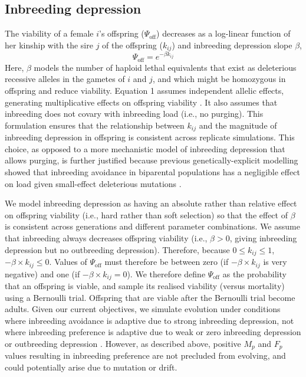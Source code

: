 \documentclass[12pt]{article}
\begin{document}
\subsection*{Inbreeding depression}

The viability of a female $i$'s offspring ($\Psi_{\textrm{off}}$) decreases as a log-linear function of her kinship with the sire $j$ of the offspring ($k_{ij}$) and inbreeding depression slope $\beta$,
\begin{equation}
\Psi_{\textrm{off}} = e^{-\beta k_{ij}}
\end{equation}
Here, $\beta$ models the number of haploid lethal equivalents that exist as deleterious recessive alleles in the gametes of $i$ and $j$, and which might be homozygous in offspring and reduce viability. Equation 1 assumes independent allelic effects, generating multiplicative effects on offspring viability \cite[][]{Morton1956, Mills1994}. It also assumes that inbreeding does not covary with inbreeding load (i.e., no purging). This formulation ensures that the relationship between $k_{ij}$ and the magnitude of inbreeding depression in offspring is consistent across replicate simulations. This choice, as opposed to a more mechanistic model of inbreeding depression that allows purging, is further justified because previous genetically-explicit modelling \cite[][]{Duthie2016a} showed that inbreeding avoidance in biparental populations has a negligible effect on load given small-effect deleterious mutations \cite[see also][]{Wang1999, Guillaume2006}. 

We model inbreeding depression as having an absolute rather than relative effect on offspring viability (i.e., hard rather than soft selection) so that the effect of $\beta$ is consistent across generations and different parameter combinations. We assume that inbreeding always decreases offspring viability (i.e., $\beta > 0$, giving inbreeding depression but no outbreeding depression). Therefore, because $0 \leq k_{ij} \leq 1$, $-\beta \times k_{ij} \leq 0$. Values of $\Psi_{\textrm{off}}$ must therefore be between zero (if $-\beta \times k_{ij}$ is very negative) and one (if $-\beta \times k_{ij} = 0$). We therefore define $\Psi_{\textrm{off}}$ as the probability that an offspring is viable, and sample its realised viability (versus mortality) using a Bernoulli trial. Offspring that are viable after the Bernoulli trial become adults. Given our current objectives, we simulate evolution under conditions where inbreeding avoidance is adaptive due to strong inbreeding depression, not where inbreeding preference is adaptive due to weak or zero inbreeding depression \cite[][]{Parker1979, Kokko2006, Duthie2016a} or outbreeding depression \cite[][]{Bateson1983, Greeff2009}. However, as described above, positive $M_{p}$ and $F_{p}$ values resulting in inbreeding preference are not precluded from evolving, and could potentially arise due to mutation or drift.
\end{document}
